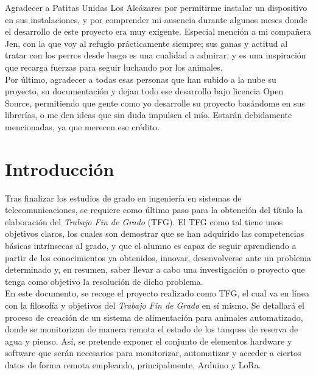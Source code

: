 \documentclass[12pt]{article}
\begin{document}
	\noindent Agradecer a Patitas Unidas Los Alcázares por permitirme instalar un dispositivo en sus instalaciones, y por comprender mi ausencia durante algunos meses donde el desarrollo de este proyecto era muy exigente. Especial mención a mi compañera Jen, con la que voy al refugio prácticamente siempre; sus ganas y actitud al tratar con los perros desde luego es una cualidad a admirar, y es una inspiración que recarga fuerzas para seguir luchando por los animales.\\
	
	\noindent Por último, agradecer a todas esas personas que han subido a la nube su proyecto, su documentación y dejan todo ese desarrollo bajo licencia Open Source, permitiendo que gente como yo desarrolle su proyecto basándome en sus librerías, o me den ideas que sin duda impulsen el mío. Estarán debidamente mencionadas, ya que merecen ese crédito.\\
	
	\pagebreak
	
	\section[Introducción]{Introducción} %
	
	Tras finalizar los estudios de grado en ingeniería en sistemas de telecomunicaciones, se requiere como último paso para la obtención del título la elaboración del \textit{Trabajo Fin de Grado} (TFG). 
	El TFG como tal tiene unos objetivos claros, los cuales son demostrar que se han adquirido las competencias básicas intrínsecas al grado, y que el alumno es capaz de seguir aprendiendo a partir de los conocimientos ya obtenidos, innovar, desenvolverse ante un problema determinado y, en resumen, saber llevar a cabo una investigación o proyecto que tenga como objetivo la resolución de dicho problema. \\
	
	\noindent En este documento, se recoge el proyecto realizado como TFG,  el cual va en línea con la filosofía y objetivos del \textit{Trabajo Fin de Grado} en sí mismo. Se detallará el proceso de creación de un sistema de alimentación para animales automatizado, donde se monitorizan de manera remota el estado de los tanques de reserva de agua y pienso. Así, se pretende exponer el conjunto de elementos hardware y software que serán necesarios para monitorizar, automatizar y acceder a ciertos datos de forma remota empleando, principalmente, Arduino y LoRa.\\
	
\end{document}
